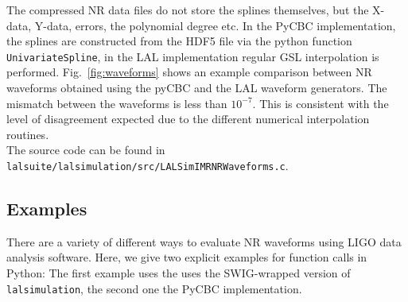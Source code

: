 \documentclass[11pt,tightenlines,article,amssymb,amsmath,amsfonts,superscriptaddress,nofootinbib]{revtex4}
\begin{document}
The compressed NR data files do not store the splines themselves, but the X-data, Y-data, errors, the polynomial degree etc. In the PyCBC implementation,
the splines are constructed from the HDF5 file via the python function \texttt{UnivariateSpline}, in the LAL implementation regular GSL interpolation
is performed. Fig.~\ref{fig:waveforms} shows an example comparison between NR waveforms obtained using the pyCBC and the LAL waveform generators. The mismatch
between the waveforms is less than $10^{-7}$. This is consistent with the level of disagreement expected due to the different numerical interpolation
routines. \\
The source code can be found in \texttt{lalsuite/lalsimulation/src/LALSimIMRNRWaveforms.c}.


\subsection{Examples}
There are a variety of different ways to evaluate NR waveforms using LIGO data analysis software. Here, we give two explicit examples
for function calls in Python: The first example uses the uses the SWIG-wrapped version of \texttt{lalsimulation}, the second one the PyCBC implementation.
\end{document}
